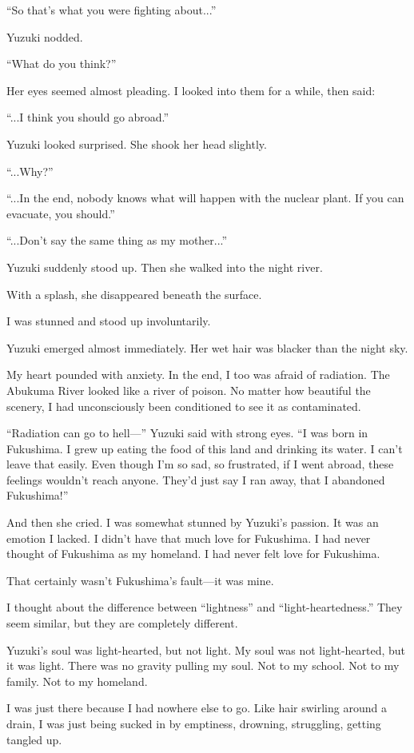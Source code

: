 \documentclass[
    a4paper,
    12pt,
    twoside,
    openany,
    UTF8,
    fontset=windows
]{ctexbook}
\begin{document}
``So that's what you were fighting about...''

Yuzuki nodded.

``What do you think?''

Her eyes seemed almost pleading. I looked into them for a while, then said:

``...I think you should go abroad.''

Yuzuki looked surprised. She shook her head slightly.

``...Why?''

``...In the end, nobody knows what will happen with the nuclear plant. If you can evacuate, you should.''

``...Don't say the same thing as my mother...''

Yuzuki suddenly stood up. Then she walked into the night river.

With a splash, she disappeared beneath the surface.

I was stunned and stood up involuntarily.

Yuzuki emerged almost immediately. Her wet hair was blacker than the night sky.

My heart pounded with anxiety. In the end, I too was afraid of radiation. The Abukuma River looked like a river of poison. No matter how beautiful the scenery, I had unconsciously been conditioned to see it as contaminated.

``Radiation can go to hell---'' Yuzuki said with strong eyes. ``I was born in Fukushima. I grew up eating the food of this land and drinking its water. I can't leave that easily. Even though I'm so sad, so frustrated, if I went abroad, these feelings wouldn't reach anyone. They'd just say I ran away, that I abandoned Fukushima!''

And then she cried. I was somewhat stunned by Yuzuki's passion. It was an emotion I lacked. I didn't have that much love for Fukushima. I had never thought of Fukushima as my homeland. I had never felt love for Fukushima.

That certainly wasn't Fukushima's fault---it was mine.

I thought about the difference between ``lightness'' and ``light-heartedness.'' They seem similar, but they are completely different.

Yuzuki's soul was light-hearted, but not light. My soul was not light-hearted, but it was light. There was no gravity pulling my soul. Not to my school. Not to my family. Not to my homeland.

I was just there because I had nowhere else to go. Like hair swirling around a drain, I was just being sucked in by emptiness, drowning, struggling, getting tangled up.
\end{document}
